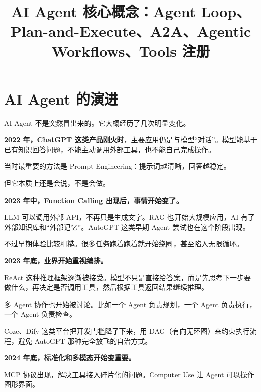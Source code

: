 \documentclass[9pt,a4paper,twocolumn]{ctexart}
\begin{document}
\title{AI Agent 核心概念：Agent Loop、Plan-and-Execute、A2A、Agentic Workflows、Tools 注册}
\date{}
\maketitle
{}

\section*{AI Agent 的演进}


AI Agent 不是突然冒出来的。它大概经历了几次明显变化。



\textbf{2022 年，ChatGPT 这类产品刚火时}，主要应用仍是与模型“对话”。模型能基于已有知识回答问题，不能主动调用外部工具，也不能自己完成操作。



当时最重要的方法是 Prompt Engineering：提示词越清晰，回答越稳定。



但它本质上还是会说，不是会做。



\textbf{2023 年中，Function Calling 出现后，事情开始变了。}



LLM 可以调用外部 API，不再只是生成文字。RAG 也开始大规模应用，AI 有了外部知识库和“外部记忆”。AutoGPT 这类早期 Agent 尝试也在这个阶段出现。



不过早期体验比较粗糙。很多任务跑着跑着就开始绕圈，甚至陷入无限循环。



\textbf{2023 年底，业界开始重视编排。}



ReAct 这种推理框架逐渐被接受。模型不只是直接给答案，而是先思考下一步要做什么，再决定是否调用工具，然后根据工具返回结果继续推理。



多 Agent 协作也开始被讨论。比如一个 Agent 负责规划，一个 Agent 负责执行，一个 Agent 负责检查。



Coze、Dify 这类平台把开发门槛降了下来，用 DAG（有向无环图）来约束执行流程，避免 AutoGPT 那种完全放飞的自治方式。



\textbf{2024 年底，标准化和多模态开始变重要。}



MCP 协议出现，解决工具接入碎片化的问题。Computer Use 让 Agent 可以操作图形界面。
\end{document}
